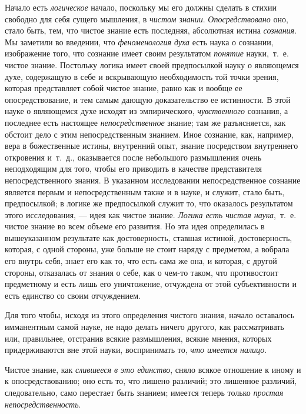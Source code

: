 Начало есть {\em логическое} начало, поскольку мы его
должны сделать в стихии свободно для себя сущего мышления, в
{\em чистом знании}.
{\em Опосредствовано} оно, стало быть, тем, что чистое
знание есть последняя, абсолютная истина
{\em сознания}. Мы заметили во введении, что
{\em феноменология духа} есть наука о сознании,
изображение того, что сознание имеет своим результатом
{\em понятие} науки,~т.~е. чистое знание. Постольку
логика имеет своей предпосылкой науку о являющемся духе, содержащую в себе
и вскрывающую необходимость той точки зрения, которая представляет собой
чистое знание, равно как и вообще ее опосредствование, и тем самым дающую
доказательство ее истинности. В этой науке о являющемся духе исходят из
эмпирического, {\em чувственного} сознания, а последнее
есть настоящее {\em непосредственное} знание; там же
разъясняется, как обстоит дело с этим непосредственным знанием. Иное
сознание, как, например, вера в божественные истины, внутренний опыт,
знание посредством внутреннего откровения и~т.~д., оказывается после
небольшого размышления очень неподходящим для того, чтобы его приводить в
качестве представителя непосредственного знания. В указанном исследовании
непосредственное сознание является первым и непосредственным также и в
науке, и служит, стало быть, предпосылкой; в логике же предпосылкой служит
то, что оказалось результатом этого исследования, — идея как чистое знание.
{\em Логика есть чистая наука},~т.~е. чистое знание во
всем объеме его развития. Но эта идея определилась в вышеуказанном
результате как достоверность, ставшая истиной, достоверность, которая, с
одной стороны, уже больше не стоит наряду с предметом, а вобрала его внутрь
себя, знает его как то, что есть сама же она, и которая, с другой стороны,
отказалась от знания о себе, как о чем-то таком, что противостоит
предметному и есть лишь его уничтожение, отчуждена от этой субъективности и
есть единство со своим отчуждением.

Для того чтобы, исходя из этого определения чистого знания, начало
оставалось имманентным самой науке, не надо делать ничего другого, как
рассматривать или, правильнее, отстранив всякие размышления, всякие мнения,
которых придерживаются вне этой науки, воспринимать то,
{\em что имеется налицо}.

Чистое знание, как {\em слившееся в это единство}, сняло
всякое отношение к иному и к опосредствованию; оно есть то, что лишено
различий; это лишенное различий, следовательно, само перестает быть
знанием; имеется теперь только {\em простая
непосредственность}.

